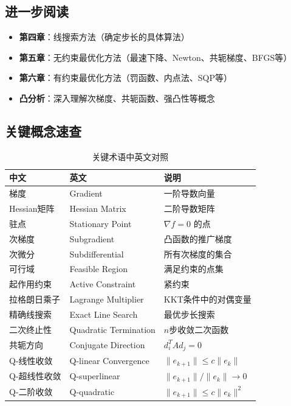\subsection{进一步阅读}

\begin{notebox}[后续章节关联]
\begin{itemize}[itemsep=0.3em]
    \item \textbf{第四章}：线搜索方法（确定步长的具体算法）
    \item \textbf{第五章}：无约束最优化方法（最速下降、Newton、共轭梯度、BFGS等）
    \item \textbf{第六章}：有约束最优化方法（罚函数、内点法、SQP等）
    \item \textbf{凸分析}：深入理解次梯度、共轭函数、强凸性等概念
\end{itemize}
\end{notebox}

\subsection{关键概念速查}

\begin{table}[htbp]
\centering
\caption{关键术语中英文对照}
\begin{tabular}{@{}lll@{}}
\toprule
\textbf{中文} & \textbf{英文} & \textbf{说明} \\
\midrule
梯度 & Gradient & 一阶导数向量 \\
Hessian矩阵 & Hessian Matrix & 二阶导数矩阵 \\
驻点 & Stationary Point & $\nabla f = 0$ 的点 \\
次梯度 & Subgradient & 凸函数的推广梯度 \\
次微分 & Subdifferential & 所有次梯度的集合 \\
可行域 & Feasible Region & 满足约束的点集 \\
起作用约束 & Active Constraint & 紧约束 \\
拉格朗日乘子 & Lagrange Multiplier & KKT条件中的对偶变量 \\
精确线搜索 & Exact Line Search & 最优步长搜索 \\
二次终止性 & Quadratic Termination & $n$步收敛二次函数 \\
共轭方向 & Conjugate Direction & $d_i^T A d_j = 0$ \\
Q-线性收敛 & Q-linear Convergence & $\|e_{k+1}\| \leq c\|e_k\|$ \\
Q-超线性收敛 & Q-superlinear & $\|e_{k+1}\|/\|e_k\| \to 0$ \\
Q-二阶收敛 & Q-quadratic & $\|e_{k+1}\| \leq c\|e_k\|^2$ \\
\bottomrule
\end{tabular}
\end{table}

\newpage

